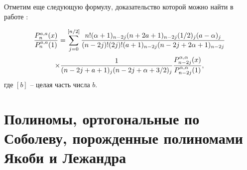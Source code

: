 Отметим еще следующую формулу, доказательство которой можно найти в работе \cite{Gasper}:


$$
{P_n^{a,a}(x)\over P_n^{a,a}(1)}=\sum_{j=0}^{[n/2]}
   { n!(\alpha+1)_{n-2j}(n+2a+1)_{n-2j}(1/2)_j(a-\alpha)_j
    \over (n-2j)!(2j)!(a+1)_{n-2j}(n-2j+2\alpha+1)_{n-2j}}
     $$
\begin{equation}\label{sobleg-2.15}
    \times{1\over (n-2j+a+1)_j(n-2j+\alpha+3/2)_j}
     {P_{n-2j}^{\alpha,\alpha}(x)\over
P_{n-2j}^{\alpha,\alpha}(1)},
\end{equation}
где $[b]$ -- целая часть числа $b$.





\section{Полиномы, ортогональные по Соболеву, порожденные полиномами Якоби и Лежандра}

